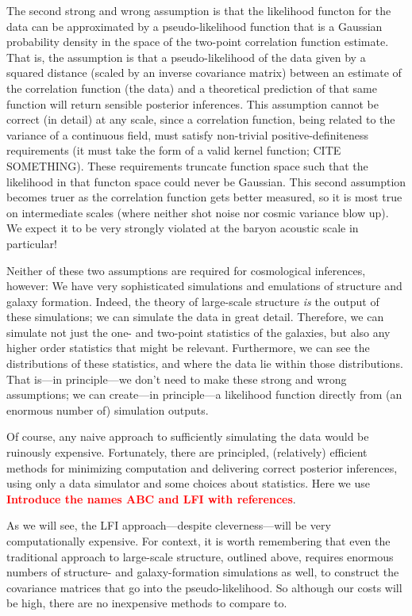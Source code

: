 \documentclass[12pt, preprint]{aastex}
\newcommand{\todo}[1]{{\bf \textcolor{red}{ #1}}}
\begin{document}
The second strong and wrong assumption is that the likelihood functon for the data can
be approximated by a pseudo-likelihood function that is a Gaussian probability density
in the space of the two-point correlation function estimate.
That is, the assumption is that a pseudo-likelihood of the data given by a squared distance
(scaled by an inverse covariance matrix) between an estimate of the correlation function
(the data) and a theoretical prediction of that same function will return sensible posterior
inferences.
This assumption cannot be correct (in detail) at any scale, since a correlation function,
being related to the variance of a continuous field,
must satisfy non-trivial positive-definiteness
requirements (it must take the form of a valid kernel function; CITE SOMETHING).
These requirements truncate function space such that the likelihood in that functon space
could never be Gaussian.
This second assumption becomes truer as the correlation function gets better measured, so
it is most true on intermediate scales (where neither shot noise nor cosmic variance blow up).
We expect it to be very strongly violated at the baryon acoustic scale in particular!

Neither of these two assumptions are required for cosmological inferences, however:
We have very sophisticated simulations and emulations of structure and galaxy formation.
Indeed, the theory of large-scale structure \emph{is} the output of these simulations;
we can simulate the data in great detail.
Therefore, we can simulate not just the one- and two-point statistics of the galaxies,
but also any higher order statistics that might be relevant.
Furthermore, we can see the distributions of these statistics, and where the data lie within
those distributions.
That is---in principle---we don't need to make these strong and wrong assumptions;
we can create---in principle---a likelihood function directly from (an enormous number of)
simulation outputs.

Of course, any naive approach to sufficiently simulating the data would be ruinously
expensive.
Fortunately, there are principled, (relatively) efficient methods for minimizing computation
and delivering correct posterior inferences,
using only a data simulator and some choices about statistics.
Here we use \todo{Introduce the names ABC and LFI with references}.

As we will see, the LFI approach---despite cleverness---will be very computationally expensive.
For context, it is worth remembering that even the traditional approach to large-scale structure,
outlined above, requires enormous numbers of structure- and galaxy-formation simulations as well,
to construct the covariance matrices that go into the pseudo-likelihood.
So although our costs will be high, there are no inexpensive methods to compare to.
\end{document}

